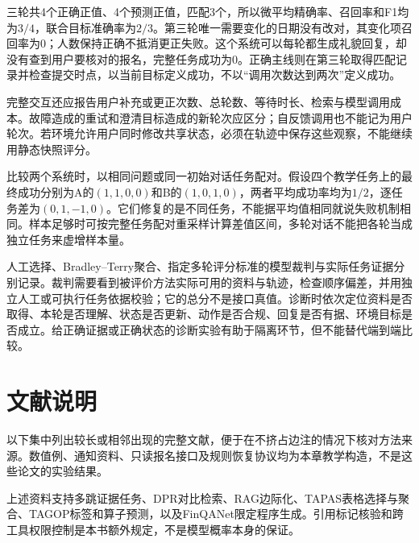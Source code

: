 三轮共4个正确正值、4个预测正值，匹配3个，所以微平均精确率、召回率和F1均为$3/4$，联合目标准确率为$2/3$。第三轮唯一需要变化的日期没有改对，其变化项召回率为0；人数保持正确不抵消更正失败。这个系统可以每轮都生成礼貌回复，却没有查到用户要核对的报名，完整任务成功为0。正确主线则在第三轮取得匹配记录并检查提交时点，以当前目标定义成功，不以“调用次数达到两次”定义成功。

完整交互还应报告用户补充或更正次数、总轮数、等待时长、检索与模型调用成本。故障造成的重试和澄清目标造成的新轮次应区分；自反馈调用也不能记为用户轮次。若环境允许用户同时修改共享状态，必须在轨迹中保存这些观察，不能继续用静态快照评分。

比较两个系统时，以相同问题或同一初始对话任务配对。假设四个教学任务上的最终成功分别为A的$(1,1,0,0)$和B的$(1,0,1,0)$，两者平均成功率均为$1/2$，逐任务差为$(0,1,-1,0)$。它们修复的是不同任务，不能据平均值相同就说失败机制相同。样本足够时可按完整任务配对重采样计算差值区间，多轮对话不能把各轮当成独立任务来虚增样本量。

人工选择、Bradley--Terry聚合、指定多轮评分标准的模型裁判与实际任务证据分别记录。裁判需要看到被评价方法实际可用的资料与轨迹，检查顺序偏差，并用独立人工或可执行任务依据校验；它的总分不是接口真值。诊断时依次定位资料是否取得、本轮是否理解、状态是否更新、动作是否合规、回复是否有据、环境目标是否成立。给正确证据或正确状态的诊断实验有助于隔离环节，但不能替代端到端比较。

\section*{文献说明}
\label{sec:nlp-dialogue-literature}

以下集中列出较长或相邻出现的完整文献，便于在不挤占边注的情况下核对方法来源。数值例、通知资料、只读报名接口及规则恢复协议均为本章教学构造，不是这些论文的实验结果。

\begin{fullwidth}
\raggedright
{}\par
{}\par
{}\par
{}\par
{}\par
{}\par
{}\par
\end{fullwidth}

上述资料支持多跳证据任务、DPR对比检索、RAG边际化、TAPAS表格选择与聚合、TAGOP标签和算子预测，以及FinQANet限定程序生成。引用标记核验和跨工具权限控制是本书额外规定，不是模型概率本身的保证。

